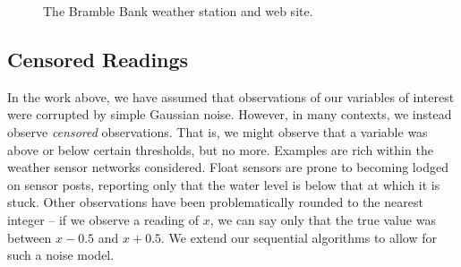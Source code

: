 \documentclass{acmtrans2m}
\begin{document}
\begin{figure}[tp!]
\begin{center}
 \hspace{0.25cm}
\caption{The Bramble Bank weather station and web site.}
\label{bramble_sensor}
\end{center}
\end{figure}

\subsection{Censored Readings}

In the work above, we have assumed that observations of our variables of interest were corrupted by simple Gaussian noise. However, in many contexts, we instead observe \emph{censored} observations. That is, we might observe that a variable was above or below certain thresholds, but no more. Examples are rich within the weather sensor networks considered. Float sensors are prone to becoming lodged on sensor posts, reporting only that the water level is below that at which it is stuck. Other observations have been problematically rounded to the nearest integer -- if we observe a reading of $x$, we can say only that the true value was between $x-0.5$ and $x+0.5$. We extend our sequential algorithms to allow for such a noise model. 
\end{document}

